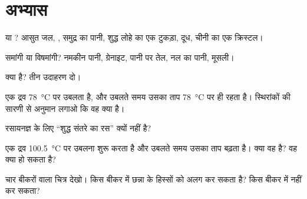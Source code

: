 \section{अभ्यास}

\begin{exercise}[$\star$]\label{exo:g6:pure-substances-and-mixtures:1}
 या ? आसुत जल, , समुद्र का पानी, शुद्ध लोहे का एक
टुकड़ा, दूध, चीनी का एक क्रिस्टल।
\end{exercise}

\begin{exercise}[$\star$]\label{exo:g6:pure-substances-and-mixtures:2}
समांगी या विषमांगी? नमकीन पानी, ग्रेनाइट, पानी पर तेल, नल का
पानी, मूसली।
\end{exercise}

\begin{exercise}[$\star$]\label{exo:g6:pure-substances-and-mixtures:3}
 क्या है? तीन उदाहरण दो।
\end{exercise}

\begin{exercise}[$\star$]\label{exo:g6:pure-substances-and-mixtures:4}
एक द्रव \qty{78}{\celsius} पर उबलता है, और उबलते समय उसका ताप
\qty{78}{\celsius} पर ही रहता है। स्थिरांकों की सारणी से अनुमान लगाओ कि
वह क्या है।
\end{exercise}

\begin{exercise}[$\star$]\label{exo:g6:pure-substances-and-mixtures:5}
रसायनज्ञ के लिए ``शुद्ध संतरे का रस''  क्यों नहीं है?
\end{exercise}

\begin{exercise}[$\star\star$]\label{exo:g6:pure-substances-and-mixtures:6}
एक द्रव \qty{100.5}{\celsius} पर उबलना शुरू करता है और उबलते समय उसका ताप
बढ़ता है। क्या वह  है? वह क्या हो सकता है?
\end{exercise}

\begin{exercise}[$\star\star$]\label{exo:g6:pure-substances-and-mixtures:7}
चार बीकरों वाला चित्र देखो। किस बीकर में छन्ना  के हिस्सों को अलग कर
सकता है? किस बीकर में नहीं कर सकता?
\end{exercise}

